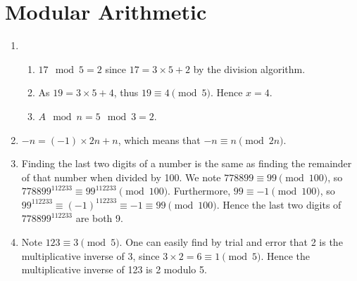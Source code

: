 \section{Modular Arithmetic}
\begin{enumerate}
    \item \begin{enumerate}[label=(\alph*)]
        \item $17 \mod 5 = 2$ since $17 = 3 \times 5 + 2$ by the division algorithm.
        \item As $19 = 3 \times 5 + 4$, thus $19 \equiv 4 \pmod 5$. Hence $x = 4$.
        \item $A \mod n = 5 \mod 3 = 2$.
    \end{enumerate}
    \item $-n = (-1) \times 2n + n$, which means that $-n \equiv n \pmod{2n}$.
    \item Finding the last two digits of a number is the same as finding the remainder of that number when divided by 100. We note $778899 \equiv 99 \pmod{100}$, so $778899^{112233} \equiv 99^{112233} \pmod{100}$. Furthermore, $99 \equiv -1 \pmod{100}$, so $99^{112233}\equiv (-1)^{112233} \equiv -1 \equiv 99 \pmod{100}$. Hence the last two digits of $778899^{112233}$ are both 9.
    \item Note $123 \equiv 3 \pmod 5$. One can easily find by trial and error that 2 is the multiplicative inverse of 3, since $3 \times 2 = 6 \equiv 1 \pmod 5$. Hence the multiplicative inverse of 123 is 2 modulo 5.
\end{enumerate}

\printbibliography[heading=bibintoc, title={References and Bibliography}]



